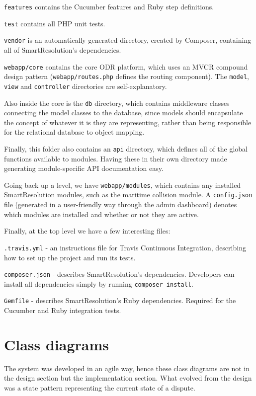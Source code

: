 \lstinline{features} contains the Cucumber features and Ruby step definitions.

\lstinline{test} contains all PHP unit tests.

\lstinline{vendor} is an automatically generated directory, created by Composer, containing all of SmartResolution's dependencies.

\lstinline{webapp/core} contains the core ODR platform, which uses an MVCR compound design pattern (\lstinline{webapp/routes.php} defines the routing component). The \lstinline{model}, \lstinline{view} and \lstinline{controller} directories are self-explanatory.

Also inside the core is the \lstinline{db} directory, which contains middleware classes connecting the model classes to the database, since models should encapsulate the concept of whatever it is they are representing, rather than being responsible for the relational database to object mapping.

Finally, this folder also contains an \lstinline{api} directory, which defines all of the global functions available to modules. Having these in their own directory made generating module-specific API documentation easy.

Going back up a level, we have \lstinline{webapp/modules}, which contains any installed SmartResolution modules, such as the maritime collision module. A \lstinline{config.json} file (generated in a user-friendly way through the admin dashboard) denotes which modules are installed and whether or not they are active.

Finally, at the top level we have a few interesting files:

\lstinline{.travis.yml} - an instructions file for Travis Continuous Integration, describing how to set up the project and run its tests.

\lstinline{composer.json} - describes SmartResolution's dependencies. Developers can install all dependencies simply by running \lstinline{composer install}.

\lstinline{Gemfile} - describes SmartResolution's Ruby dependencies. Required for the Cucumber and Ruby integration tests.

\section{Class diagrams}

The system was developed in an agile way, hence these class diagrams are not in the design section but the implementation section. What evolved from the design was a state pattern representing the current state of a dispute.

